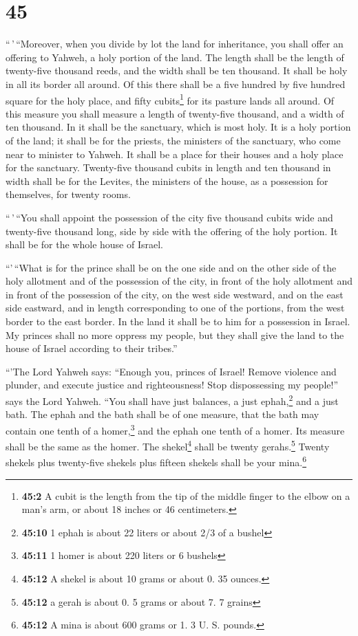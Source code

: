 \hypertarget{section-43}{%
\section{45}\label{section-43}}

 ``\,'\,``Moreover, when you divide by lot the land for
inheritance, you shall offer an offering to Yahweh, a holy portion of
the land. The length shall be the length of twenty-five thousand reeds,
and the width shall be ten thousand. It shall be holy in all its border
all around.  Of this there shall be a five hundred by five
hundred square for the holy place, and fifty cubits\footnote{\textbf{45:2}
  A cubit is the length from the tip of the middle finger to the elbow
  on a man's arm, or about 18 inches or 46 centimeters.} for its pasture
lands all around.  Of this measure you shall measure a
length of twenty-five thousand, and a width of ten thousand. In it shall
be the sanctuary, which is most holy.  It is a holy
portion of the land; it shall be for the priests, the ministers of the
sanctuary, who come near to minister to Yahweh. It shall be a place for
their houses and a holy place for the sanctuary. 
Twenty-five thousand cubits in length and ten thousand in width shall be
for the Levites, the ministers of the house, as a possession for
themselves, for twenty rooms.

 ``\,'\,``You shall appoint the possession of the city
five thousand cubits wide and twenty-five thousand long, side by side
with the offering of the holy portion. It shall be for the whole house
of Israel.

 ``'\,``What is for the prince shall be on the one side
and on the other side of the holy allotment and of the possession of the
city, in front of the holy allotment and in front of the possession of
the city, on the west side westward, and on the east side eastward, and
in length corresponding to one of the portions, from the west border to
the east border.  In the land it shall be to him for a
possession in Israel. My princes shall no more oppress my people, but
they shall give the land to the house of Israel according to their
tribes.''

 ``'The Lord Yahweh says: ``Enough you, princes of Israel!
Remove violence and plunder, and execute justice and righteousness! Stop
dispossessing my people!'' says the Lord Yahweh.  ``You
shall have just balances, a just ephah,\footnote{\textbf{45:10} 1 ephah
  is about 22 liters or about 2/3 of a bushel} and a just bath.
 The ephah and the bath shall be of one measure, that the
bath may contain one tenth of a homer,\footnote{\textbf{45:11} 1 homer
  is about 220 liters or 6 bushels} and the ephah one tenth of a homer.
Its measure shall be the same as the homer.  The
shekel\footnote{\textbf{45:12} A shekel is about 10 grams or about 0. 35
  ounces.} shall be twenty gerahs.\footnote{\textbf{45:12} a gerah is
  about 0. 5 grams or about 7. 7 grains} Twenty shekels plus twenty-five
shekels plus fifteen shekels shall be your mina.\footnote{\textbf{45:12}
  A mina is about 600 grams or 1. 3 U. S. pounds.}


